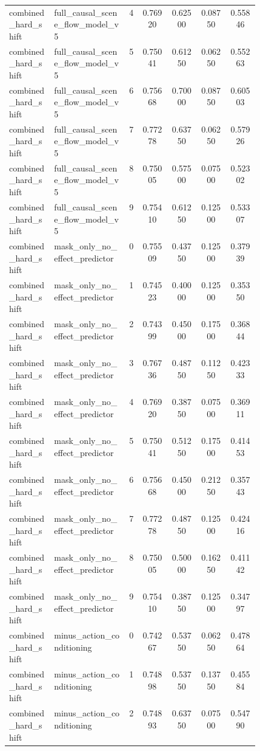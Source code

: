 \documentclass{article}
\begin{document}
\begin{center}
\begin{longtable}{p{0.18\linewidth}p{0.30\linewidth}ccccc}
combined\_hard\_shift & full\_causal\_scene\_flow\_model\_v5 & 4 & 0.76920 & 0.62500 & 0.08750 & 0.55846\\
combined\_hard\_shift & full\_causal\_scene\_flow\_model\_v5 & 5 & 0.75041 & 0.61250 & 0.06250 & 0.55263\\
combined\_hard\_shift & full\_causal\_scene\_flow\_model\_v5 & 6 & 0.75668 & 0.70000 & 0.08750 & 0.60503\\
combined\_hard\_shift & full\_causal\_scene\_flow\_model\_v5 & 7 & 0.77278 & 0.63750 & 0.06250 & 0.57926\\
combined\_hard\_shift & full\_causal\_scene\_flow\_model\_v5 & 8 & 0.75005 & 0.57500 & 0.07500 & 0.52302\\
combined\_hard\_shift & full\_causal\_scene\_flow\_model\_v5 & 9 & 0.75410 & 0.61250 & 0.12500 & 0.53307\\
combined\_hard\_shift & mask\_only\_no\_effect\_predictor & 0 & 0.75509 & 0.43750 & 0.12500 & 0.37939\\
combined\_hard\_shift & mask\_only\_no\_effect\_predictor & 1 & 0.74523 & 0.40000 & 0.12500 & 0.35350\\
combined\_hard\_shift & mask\_only\_no\_effect\_predictor & 2 & 0.74399 & 0.45000 & 0.17500 & 0.36844\\
combined\_hard\_shift & mask\_only\_no\_effect\_predictor & 3 & 0.76736 & 0.48750 & 0.11250 & 0.42333\\
combined\_hard\_shift & mask\_only\_no\_effect\_predictor & 4 & 0.76920 & 0.38750 & 0.07500 & 0.36911\\
combined\_hard\_shift & mask\_only\_no\_effect\_predictor & 5 & 0.75041 & 0.51250 & 0.17500 & 0.41453\\
combined\_hard\_shift & mask\_only\_no\_effect\_predictor & 6 & 0.75668 & 0.45000 & 0.21250 & 0.35743\\
combined\_hard\_shift & mask\_only\_no\_effect\_predictor & 7 & 0.77278 & 0.48750 & 0.12500 & 0.42416\\
combined\_hard\_shift & mask\_only\_no\_effect\_predictor & 8 & 0.75005 & 0.50000 & 0.16250 & 0.41142\\
combined\_hard\_shift & mask\_only\_no\_effect\_predictor & 9 & 0.75410 & 0.38750 & 0.12500 & 0.34797\\
combined\_hard\_shift & minus\_action\_conditioning & 0 & 0.74267 & 0.53750 & 0.06250 & 0.47864\\
combined\_hard\_shift & minus\_action\_conditioning & 1 & 0.74898 & 0.53750 & 0.13750 & 0.45584\\
combined\_hard\_shift & minus\_action\_conditioning & 2 & 0.74893 & 0.63750 & 0.07500 & 0.54790\\

\end{longtable}
\end{center}
\end{document}
